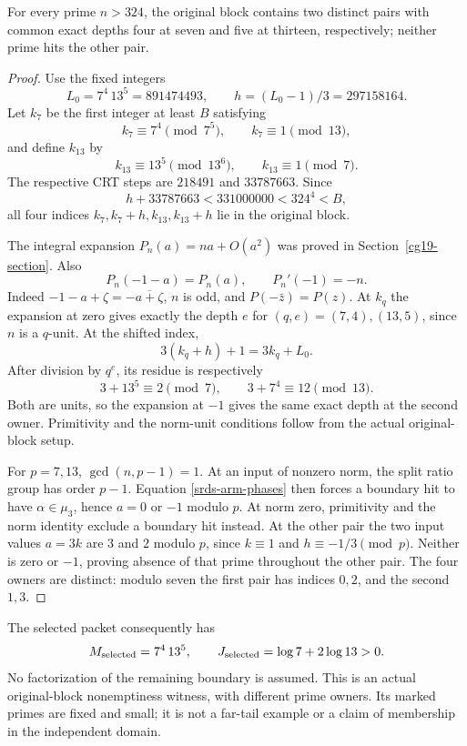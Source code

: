 \begin{proposition}
\label{srds-actual-example}
For every prime \(n>324\), the original block contains two
distinct pairs with common exact depths four at seven and five
at thirteen, respectively; neither prime hits the other pair.
\end{proposition}
\begin{proof}
Use the fixed integers
\[
 L_0=7^4\,13^5=891474493,\qquad
 h=(L_0-1)/3=297158164.
\]
Let \(k_7\) be the first integer at least \(B\) satisfying
\[
 k_7\equiv7^4\pmod{7^5},\qquad k_7\equiv1\pmod{13},
\]
and define \(k_{13}\) by
\[
 k_{13}\equiv13^5\pmod{13^6},\qquad k_{13}\equiv1\pmod7.
\]
The respective CRT steps are \(218491\) and \(33787663\).
Since
\[
 h+33787663<331000000<324^4<B,
\]
all four indices \(k_7,k_7+h,k_{13},k_{13}+h\) lie in the
original block.

The integral expansion \(P_n(a)=na+O(a^2)\) was proved in
Section~\ref{cg19-section}. Also
\[
 P_n(-1-a)=P_n(a),\qquad P_n'(-1)=-n.
\]
Indeed \(-1-a+\zeta=-\overline{a+\zeta}\), \(n\) is odd,
and \(P(-\bar z)=P(z)\). At \(k_q\) the expansion at zero
gives exactly the depth \(e\) for
\((q,e)=(7,4),(13,5)\), since \(n\) is a \(q\)-unit.
At the shifted index,
\[
 3(k_q+h)+1=3k_q+L_0.
\]
After division by \(q^e\), its residue is respectively
\[
 3+13^5\equiv2\pmod7,\qquad
 3+7^4\equiv12\pmod{13}.
\]
Both are units, so the expansion at \(-1\) gives the same exact
depth at the second owner. Primitivity and the norm-unit
conditions follow from the actual original-block setup.

For \(p=7,13\), \(\gcd(n,p-1)=1\). At an input of nonzero
norm, the split ratio group has order \(p-1\).
Equation \eqref{srds-arm-phases} then forces a boundary hit
to have \(\alpha\in\mu_3\), hence \(a=0\) or \(-1\)
modulo \(p\). At norm zero, primitivity and the norm identity
exclude a boundary hit instead. At the other pair the two
input values \(a=3k\) are \(3\) and \(2\) modulo \(p\), since
\(k\equiv1\) and \(h\equiv-1/3\pmod p\). Neither is zero or
\(-1\), proving absence of that prime throughout the other pair.
The four owners are distinct: modulo seven the first pair has
indices \(0,2\), and the second \(1,3\).
\end{proof}

The selected packet consequently has
\[
 M_{\rm selected}=7^4\,13^5,\qquad
 J_{\rm selected}=\log7+2\log13>0.
\]
No factorization of the remaining boundary is assumed. This is
an actual original-block nonemptiness witness, with different
prime owners. Its marked primes are fixed and small; it is not
a far-tail example or a claim of membership in the independent
domain.

